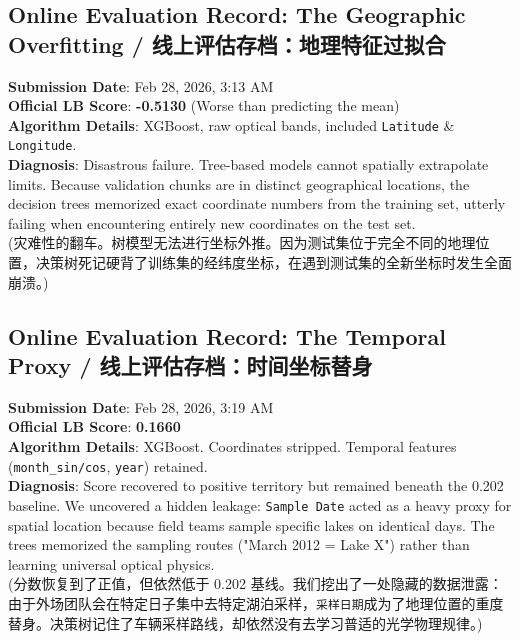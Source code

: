\subsection{Online Evaluation Record: The Geographic Overfitting / 线上评估存档：地理特征过拟合}
\begin{warningbox}
\textbf{Submission Date}: Feb 28, 2026, 3:13 AM \\
\textbf{Official LB Score}: \textbf{-0.5130} (Worse than predicting the mean) \\
\textbf{Algorithm Details}: XGBoost, raw optical bands, included \texttt{Latitude} \& \texttt{Longitude}. \\
\textbf{Diagnosis}: Disastrous failure. Tree-based models cannot spatially extrapolate limits. Because validation chunks are in distinct geographical locations, the decision trees memorized exact coordinate numbers from the training set, utterly failing when encountering entirely new coordinates on the test set. \\
(灾难性的翻车。树模型无法进行坐标外推。因为测试集位于完全不同的地理位置，决策树死记硬背了训练集的经纬度坐标，在遇到测试集的全新坐标时发生全面崩溃。)
\end{warningbox}

\subsection{Online Evaluation Record: The Temporal Proxy / 线上评估存档：时间坐标替身}
\begin{infobox}
\textbf{Submission Date}: Feb 28, 2026, 3:19 AM \\
\textbf{Official LB Score}: \textbf{0.1660} \\
\textbf{Algorithm Details}: XGBoost. Coordinates stripped. Temporal features (\texttt{month\_sin/cos}, \texttt{year}) retained. \\
\textbf{Diagnosis}: Score recovered to positive territory but remained beneath the 0.202 baseline. We uncovered a hidden leakage: \texttt{Sample Date} acted as a heavy proxy for spatial location because field teams sample specific lakes on identical days. The trees memorized the sampling routes ("March 2012 = Lake X") rather than learning universal optical physics. \\
(分数恢复到了正值，但依然低于 0.202 基线。我们挖出了一处隐藏的数据泄露：由于外场团队会在特定日子集中去特定湖泊采样，\texttt{采样日期}成为了地理位置的重度替身。决策树记住了车辆采样路线，却依然没有去学习普适的光学物理规律。)
\end{infobox}

